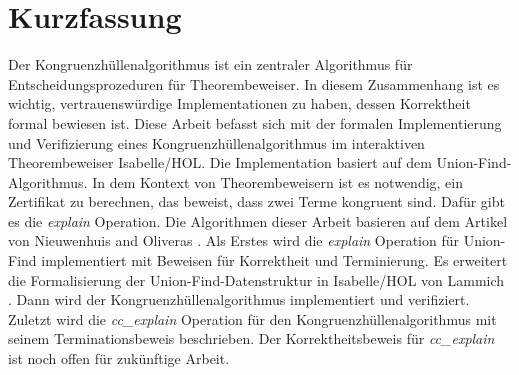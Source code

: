\chapter{Kurzfassung}

Der Kongruenzhüllenalgorithmus ist ein zentraler Algorithmus für Entscheidungsprozeduren für Theorembeweiser. In diesem Zusammenhang ist es wichtig, vertrauenswürdige Implementationen zu haben, dessen Korrektheit formal bewiesen ist. Diese Arbeit befasst sich mit der formalen Implementierung und Verifizierung eines Kongruenzhüllenalgorithmus im interaktiven Theorembeweiser Isabelle/HOL. Die Implementation basiert auf dem Union-Find-Algorithmus. In dem Kontext von Theorembeweisern ist es notwendig, ein Zertifikat zu berechnen, das beweist, dass zwei Terme kongruent sind. Dafür gibt es die \emph{explain} Operation. Die Algorithmen dieser Arbeit basieren auf dem Artikel von Nieuwenhuis and Oliveras \cite{Nieuwenhuis}.
Als Erstes wird die \emph{explain} Operation für Union-Find implementiert mit Beweisen für Korrektheit und Terminierung. Es erweitert die Formalisierung der Union-Find-Datenstruktur in Isabelle/HOL von Lammich \cite{unionfind-isabelle}. Dann wird der Kongruenzhüllenalgorithmus implementiert und verifiziert. Zuletzt wird die \emph{cc\_explain} Operation für den Kongruenzhüllenalgorithmus mit seinem Terminationsbeweis beschrieben. Der Korrektheitsbeweis für \emph{cc\_explain} ist noch offen für zukünftige Arbeit.